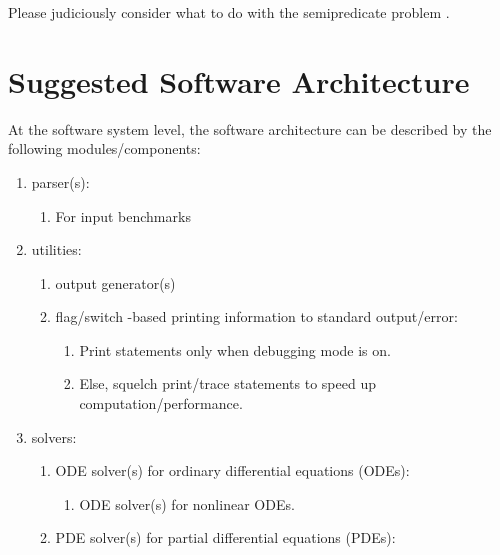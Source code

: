 \documentclass[letter,12pt]{article}
\begin{document}
Please judiciously consider what to do with the semipredicate problem \cite{WikipediaContributors2016e}.



\section{Suggested Software Architecture}
\label{sec:SuggestedSoftwareArchitecture}

At the software system level, the software architecture can be described by the following modules/components: \vspace{-0.3cm}
\begin{enumerate} \itemsep -4pt
\item parser(s): \vspace{-0.3cm}
	\begin{enumerate} \itemsep -2pt
	\item For input benchmarks
	\end{enumerate}
\item utilities: \vspace{-0.3cm}
	\begin{enumerate} \itemsep -2pt
	\item output generator(s)
	\item flag/switch -based printing information to standard output/error: \vspace{-0.2cm}
		\begin{enumerate} \itemsep -2pt
		\item Print statements only when debugging mode is on.
		\item Else, squelch print/trace statements to speed up computation/performance.
		\end{enumerate}
	\end{enumerate}
\item solvers: \vspace{-0.3cm}
	\begin{enumerate} \itemsep -2pt
	\item ODE solver(s) for ordinary differential equations (ODEs): \vspace{-0.2cm}
		\begin{enumerate} \itemsep -2pt
		\item ODE solver(s) for nonlinear ODEs.
		\end{enumerate}
	\item PDE solver(s) for partial differential equations (PDEs): \vspace{-0.2cm}

\end{enumerate}
\end{enumerate}
\end{document}
